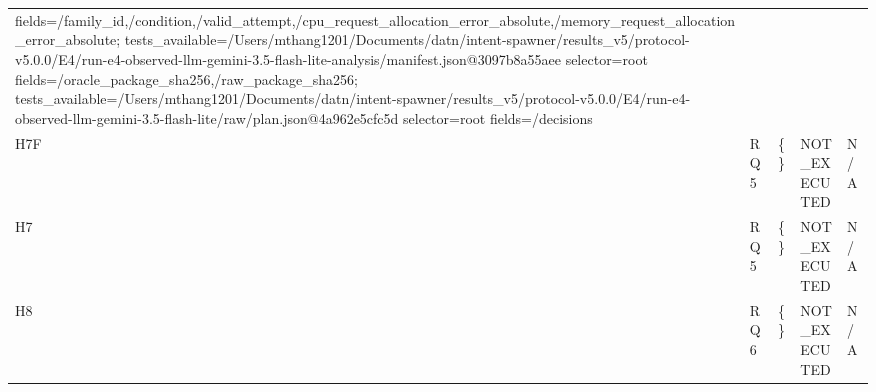 \begin{tabular}{lllll}
fields=/family\_id,/condition,/valid\_attempt,/cpu\_request\_allocation\_error\_absolute,/memory\_request\_allocation\_error\_absolute; tests\_available=/Users/mthang1201/Documents/datn/intent-spawner/results\_v5/protocol-v5.0.0/E4/run-e4-observed-llm-gemini-3.5-flash-lite-analysis/manifest.json@3097b8a55aee selector=root fields=/oracle\_package\_sha256,/raw\_package\_sha256; tests\_available=/Users/mthang1201/Documents/datn/intent-spawner/results\_v5/protocol-v5.0.0/E4/run-e4-observed-llm-gemini-3.5-flash-lite/raw/plan.json@4a962e5cfc5d selector=root fields=/decisions \\
H7F & RQ5 & \{\} & NOT\_EXECUTED & N/A \\
H7 & RQ5 & \{\} & NOT\_EXECUTED & N/A \\
H8 & RQ6 & \{\} & NOT\_EXECUTED & N/A \\
\hline
\end{tabular}
